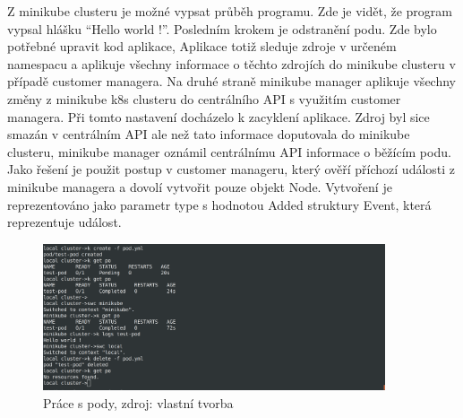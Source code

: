 			  Z minikube clusteru je možné vypsat průběh programu. Zde je vidět, že program vypsal hlášku “Hello world !”. Posledním krokem je odstranění podu. Zde bylo potřebné upravit kod aplikace, Aplikace totiž sleduje zdroje v určeném namespacu a aplikuje všechny informace o těchto zdrojích do minikube clusteru v případě customer managera. Na druhé straně minikube \linebreak manager aplikuje všechny změny z minikube k8s clusteru do centrálního API s využitím customer managera. Při tomto nastavení docházelo k zacyklení aplikace. Zdroj byl sice smazán v centrálním API ale než tato informace doputovala do minikube clusteru, minikube manager oznámil centrálnímu API informace o běžícím podu. Jako řešení je použit postup v customer manageru, který ověří příchozí události z minikube \linebreak managera a dovolí vytvořit pouze objekt Node. Vytvoření je reprezentováno jako \linebreak parametr type s hodnotou Added struktury Event, která reprezentuje událost. 
			   
\begin{figure}[H]
  \begin{centering}
    
	  \includegraphics[width=0.9\textwidth]{images/pod.png}
    \par
	  \caption{Práce s pody\label{fig:pod}, zdroj: vlastní tvorba}
    \end{centering}
\end{figure}

